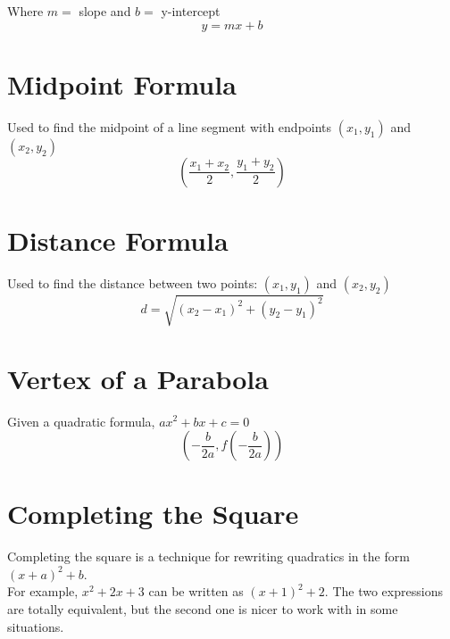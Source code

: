 \noindent Where $m =$ slope and $b =$ y-intercept
\begin{equation*}
  y=mx+b
\end{equation*}


\section{Midpoint Formula}

\noindent Used to find the midpoint of a line segment with endpoints 
$(x_1, y_1)$ and $(x_2, y_2)$
\begin{equation*}
  \left( \frac{x_1 + x_2}{2}, \frac{y_1 + y_2}{2} \right)
\end{equation*}


\section{Distance Formula}

\noindent Used to find the distance between two points: $(x_1, y_1)$ and 
$(x_2, y_2)$
\begin{equation*}
  d = \sqrt{(x_2 - x_1)^2 + (y_2 - y_1)^2}
\end{equation*}


\section{Vertex of a Parabola}

\noindent Given a quadratic formula, $ax^2+bx+c=0$
\begin{equation*}
  \left( -\frac{b}{2a}, f\left(-\frac{b}{2a} \right)\right)
\end{equation*}


\section{Completing the Square}

Completing the square is a technique for rewriting quadratics in the form
$(x+a)^2+b$.\\

\noindent For example, $x^2+2x+3$ can be written as $(x+1)^2+2$. The two 
expressions are totally equivalent, but the second one is nicer to work with in 
some situations.

